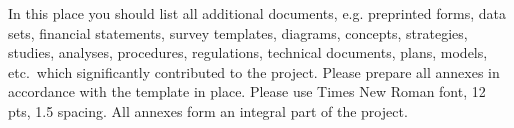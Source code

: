 In this place you should list all additional documents, e.g. preprinted forms, data sets, financial statements,
survey templates, diagrams, concepts, strategies, studies, analyses, procedures, regulations, technical documents, plans, models, etc.\ which
significantly contributed to the project.
Please prepare all annexes in accordance with the template in place.
Please use Times New Roman font, 12 pts, 1.5 spacing.
All annexes form an integral part of the project.